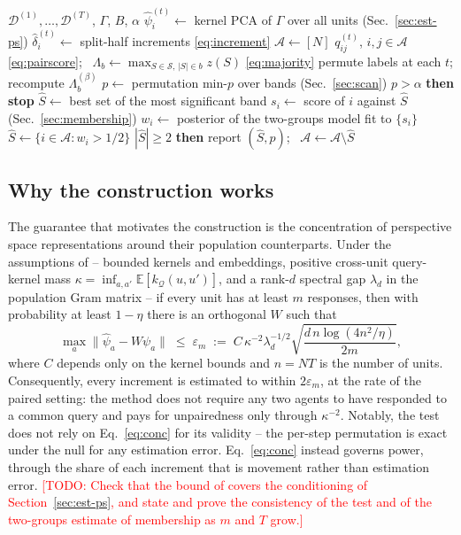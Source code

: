 \documentclass{article}
\theoremstyle{plain}
\theoremstyle{definition}
\newcommand{\Q}{\mathcal{Q}}
\newcommand{\E}{\mathbb{E}}
\newcommand{\D}{\mathcal{D}}
\newcommand{\Sfam}{\mathcal{S}}
\newcommand{\N}{[N]}
\newcommand{\todo}[1]{\textcolor{red}{[TODO: #1]}}
\begin{document}
\begin{algorithm}[t]
\caption{Detecting \& estimating colluding subnetworks}
\label{alg:main}
\begin{algorithmic}[1]
 $\D^{(1)},\dots,\D^{(T)}$, $\Gamma$, $B$, $\alpha$
\STATE $\hat\psi_i^{(t)}\leftarrow$ kernel PCA of $\Gamma$ over all units \hfill(Sec.~\ref{sec:est-ps})
\STATE $\hat\delta_i^{(t)}\leftarrow$ split-half increments \hfill\eqref{eq:increment}
\STATE $\mathcal A\leftarrow\N$
\LOOP
  \STATE $q_{ij}^{(t)}$, $i,j\in\mathcal A$ \eqref{eq:pairscore}; \ $\Lambda_b\leftarrow\max_{S\in\Sfam,\,|S|\in b} z(S)$ \eqref{eq:majority}
    \STATE permute labels at each $t$; recompute $\Lambda_b^{(\beta)}$
  \ENDFOR
  \STATE $p\leftarrow$ permutation min-$p$ over bands \hfill(Sec.~\ref{sec:scan})
   $p>\alpha$ {\bfseries then stop}
  \STATE $\hat S\leftarrow$ best set of the most significant band
  \REPEAT
    \STATE $s_i\leftarrow$ score of $i$ against $\hat S$ \hfill(Sec.~\ref{sec:membership})
    \STATE $w_i\leftarrow$ posterior of the two-groups model fit to $\{s_i\}$
    \STATE $\hat S\leftarrow\{i\in\mathcal A: w_i>1/2\}$
   $|\hat S|\ge2$ {\bfseries then} report $(\hat S,p)$; \ $\mathcal A\leftarrow\mathcal A\setminus\hat S$
\ENDLOOP
\end{algorithmic}
\end{algorithm}

\subsection{Why the construction works}
\label{sec:theory}

The guarantee that motivates the construction is the concentration of perspective space representations around their population counterparts. Under the assumptions of \citet[Theorem~1]{pkps2026} -- bounded kernels and embeddings, positive cross-unit query-kernel mass $\kappa = \inf_{a,a'}\E[k_\Q(u,u')]$, and a rank-$d$ spectral gap $\lambda_d$ in the population Gram matrix -- if every unit has at least $m$ responses, then with probability at least $1-\eta$ there is an orthogonal $W$ such that
\begin{equation}
\label{eq:conc}
\max_a \|\hat\psi_a - W\psi_a\| \;\le\; \varepsilon_m
\;:=\; C\,\kappa^{-2}\lambda_d^{-1/2}\sqrt{\frac{d\,n\log(4n^2/\eta)}{2m}} ,
\end{equation}
where $C$ depends only on the kernel bounds and $n=NT$ is the number of units. Consequently, every increment is estimated to within $2\varepsilon_m$, at the rate of the paired setting: the method does not require any two agents to have responded to a common query and pays for unpairedness only through $\kappa^{-2}$. Notably, the test does not rely on Eq.~\eqref{eq:conc} for its validity -- the per-step permutation is exact under the null for any estimation error. Eq.~\eqref{eq:conc} instead governs power, through the share of each increment that is movement rather than estimation error. \todo{Check that the bound of \citet{pkps2026} covers the conditioning of Section~\ref{sec:est-ps}, and state and prove the consistency of the test and of the two-groups estimate of membership as $m$ and $T$ grow.}
\end{document}
